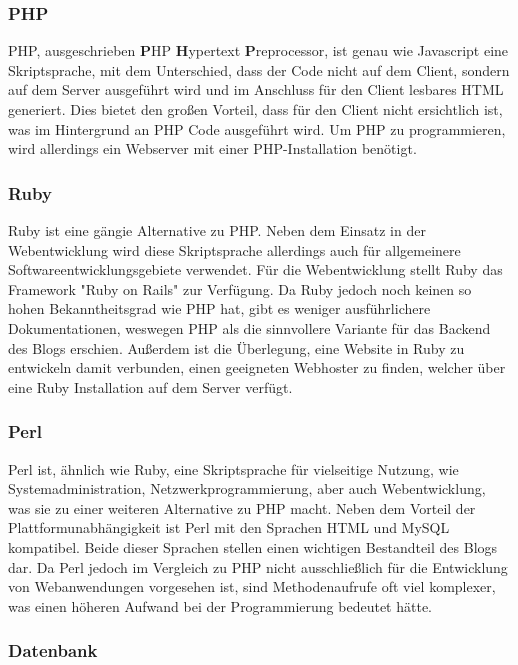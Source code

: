         \subsubsection*{PHP}
        {PHP\cite{php}, ausgeschrieben \textbf{P}HP \textbf{H}ypertext \textbf{P}reprocessor, ist genau wie Javascript eine Skriptsprache, mit dem Unterschied, dass der Code nicht auf dem Client, sondern auf dem Server ausgeführt wird
        und im Anschluss für den Client lesbares HTML generiert. Dies bietet den großen Vorteil, dass für den Client nicht ersichtlich ist, was im Hintergrund an PHP Code ausgeführt
        wird. Um PHP zu programmieren, wird allerdings ein Webserver mit einer PHP-Installation benötigt.

        \subsubsection*{Ruby}
        {Ruby\cite{ruby}} ist eine gängie Alternative zu PHP. Neben dem Einsatz in der Webentwicklung wird diese Skriptsprache allerdings auch für allgemeinere Softwareentwicklungsgebiete verwendet.
        Für die Webentwicklung stellt Ruby das Framework {"Ruby on Rails"\cite{rubyonrails}} zur Verfügung.
        Da Ruby jedoch noch keinen so hohen Bekanntheitsgrad wie PHP hat, gibt es weniger ausführlichere Dokumentationen, weswegen PHP als die sinnvollere Variante für das Backend des Blogs erschien.
        Außerdem ist die Überlegung, eine Website in Ruby zu entwickeln damit verbunden, einen geeigneten Webhoster zu finden, welcher über eine Ruby Installation auf dem Server verfügt.

        \subsubsection*{Perl}
        {Perl\cite{perl}} ist, ähnlich wie Ruby, eine Skriptsprache für vielseitige Nutzung, wie Systemadministration, Netzwerkprogrammierung, aber auch Webentwicklung, was sie
        zu einer weiteren Alternative zu PHP macht. Neben dem Vorteil der Plattformunabhängigkeit ist Perl mit den Sprachen HTML und MySQL kompatibel. Beide dieser Sprachen stellen
        einen wichtigen Bestandteil des Blogs dar. Da Perl jedoch im Vergleich zu PHP nicht ausschließlich für die Entwicklung von Webanwendungen vorgesehen ist, sind
        Methodenaufrufe oft viel komplexer, was einen höheren Aufwand bei der Programmierung bedeutet hätte.

      \subsubsection*{Datenbank}

}
